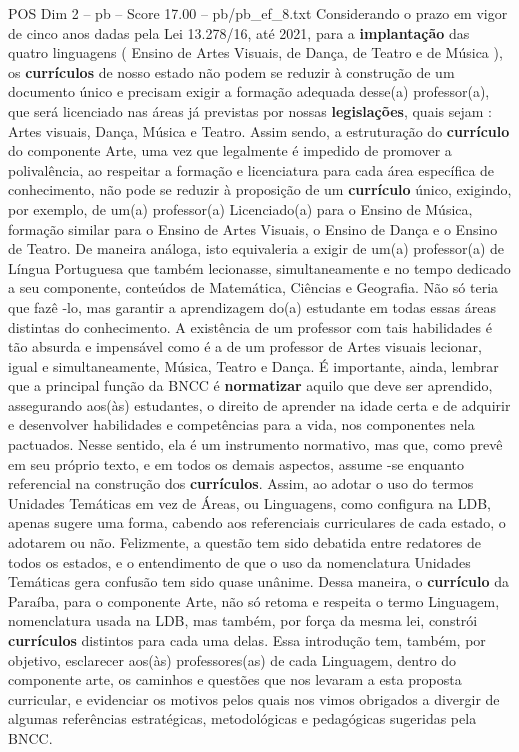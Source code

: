 \begin{textsample}{POS Dim 2 – pb – Score 17.00 – pb/pb\_ef\_8.txt}
Considerando o prazo em vigor de cinco anos dadas pela Lei 13.278/16, até 2021, para a \textbf{implantação} das quatro linguagens ( Ensino de Artes Visuais, de Dança, de Teatro e de Música ), os \textbf{currículos} de nosso estado não podem se reduzir à construção de um documento único e precisam exigir a formação adequada desse(a) professor(a), que será licenciado nas áreas já previstas por nossas \textbf{legislações}, quais sejam : Artes visuais, Dança, Música e Teatro.
Assim sendo, a estruturação do \textbf{currículo} do componente Arte, uma vez que legalmente é impedido de promover a polivalência, ao respeitar a formação e licenciatura para cada área específica de conhecimento, não pode se reduzir à proposição de um \textbf{currículo} único, exigindo, por exemplo, de um(a) professor(a) Licenciado(a) para o Ensino de Música, formação similar para o Ensino de Artes Visuais, o Ensino de Dança e o Ensino de Teatro.
De maneira análoga, isto equivaleria a exigir de um(a) professor(a) de Língua Portuguesa que também lecionasse, simultaneamente e no tempo dedicado a seu componente, conteúdos de Matemática, Ciências e Geografia.
Não só teria que fazê -lo, mas garantir a aprendizagem do(a) estudante em todas essas áreas distintas do conhecimento.
A existência de um professor com tais habilidades é tão absurda e impensável como é a de um professor de Artes visuais lecionar, igual e simultaneamente, Música, Teatro e Dança.
É importante, ainda, lembrar que a principal função da BNCC é \textbf{normatizar} aquilo que deve ser aprendido, assegurando aos(às) estudantes, o direito de aprender na idade certa e de adquirir e desenvolver habilidades e competências para a vida, nos componentes nela pactuados.
Nesse sentido, ela é um instrumento normativo, mas que, como prevê em seu próprio texto, e em todos os demais aspectos, assume -se enquanto referencial na construção dos \textbf{currículos}.
Assim, ao adotar o uso do termos Unidades Temáticas em vez de Áreas, ou Linguagens, como configura na LDB, apenas sugere uma forma, cabendo aos referenciais curriculares de cada estado, o adotarem ou não.
Felizmente, a questão tem sido debatida entre redatores de todos os estados, e o entendimento de que o uso da nomenclatura Unidades Temáticas gera confusão tem sido quase unânime.
Dessa maneira, o \textbf{currículo} da Paraíba, para o componente Arte, não só retoma e respeita o termo Linguagem, nomenclatura usada na LDB, mas também, por força da mesma lei, constrói \textbf{currículos} distintos para cada uma delas.
Essa introdução tem, também, por objetivo, esclarecer aos(às) professores(as) de cada Linguagem, dentro do componente arte, os caminhos e questões que nos levaram a esta proposta curricular, e evidenciar os motivos pelos quais nos vimos obrigados a divergir de algumas referências estratégicas, metodológicas e pedagógicas sugeridas pela BNCC.

\end{textsample}
